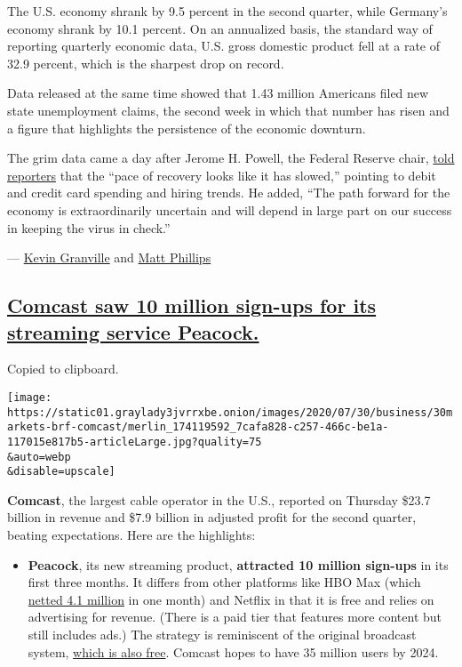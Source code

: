 The U.S. economy shrank by 9.5 percent in the second quarter, while
Germany's economy shrank by 10.1 percent. On an annualized basis, the
standard way of reporting quarterly economic data, U.S. gross domestic
product fell at a rate of 32.9 percent, which is the sharpest drop on
record.

Data released at the same time showed that 1.43 million Americans filed
new state unemployment claims, the second week in which that number has
risen and a figure that highlights the persistence of the economic
downturn.

The grim data came a day after Jerome H. Powell, the Federal Reserve
chair,
\href{https://www.nytimes3xbfgragh.onion/2020/07/29/business/economy/federal-reserve-meeting-interest-rates.html}{told
reporters} that the ``pace of recovery looks like it has slowed,''
pointing to debit and credit card spending and hiring trends. He added,
``The path forward for the economy is extraordinarily uncertain and will
depend in large part on our success in keeping the virus in check.''

--- \href{https://www.nytimes3xbfgragh.onion/by/kevin-granville}{Kevin
Granville} and
\href{https://www.nytimes3xbfgragh.onion/by/matt-phillips}{Matt
Phillips}

\hypertarget{comcast-saw-10-million-sign-ups-for-its-streaming-service-peacock}{%
\subsection{\texorpdfstring{\protect\hyperlink{comcast-saw-10-million-sign-ups-for-its-streaming-service-peacock}{Comcast
saw 10 million sign-ups for its streaming service
Peacock.}}{Comcast saw 10 million sign-ups for its streaming service Peacock.}}\label{comcast-saw-10-million-sign-ups-for-its-streaming-service-peacock}}

Copied to clipboard.

\texttt{[image: https://static01.graylady3jvrrxbe.onion/images/2020/07/30/business/30markets-brf-comcast/merlin\_174119592\_7cafa828-c257-466c-be1a-117015e817b5-articleLarge.jpg?quality=75\\\&auto=webp\\\&disable=upscale]}

\textbf{Comcast}, the largest cable operator in the U.S., reported on
Thursday \$23.7 billion in revenue and \$7.9 billion in adjusted profit
for the second quarter, beating expectations. Here are the highlights:

\begin{itemize}
\tightlist
\item
  \textbf{Peacock}, its new streaming product, \textbf{attracted 10
  million sign-ups} in its first three months. It differs from other
  platforms like HBO Max (which
  \href{https://www.nytimes3xbfgragh.onion/2020/07/23/business/media/att-hbo-max.html}{netted
  4.1 million} in one month) and Netflix in that it is free and relies
  on advertising for revenue. (There is a paid tier that features more
  content but still includes ads.) The strategy is reminiscent of the
  original broadcast system,
  \href{https://www.nytimes3xbfgragh.onion/2019/01/31/business/locast-streaming-free-network-tv.html}{which
  is also free}. Comcast hopes to have 35 million users by 2024.
\end{itemize}

